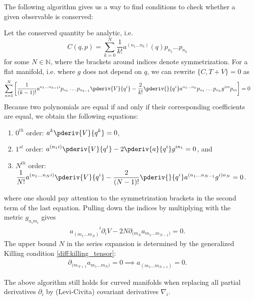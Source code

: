     The following algorithm gives us a way to find conditions to check whether a given observable is conserved:
    \begin{method}
        Let the conserved quantity be analytic, i.e. \[C(q, p) = \sum_{k=0}^N\frac{1}{k!}a^{(n_1\ldots n_k)}(q)p_{n_1}\ldots p_{n_k}\] for some $N\in\mathbb{N}$, where the brackets around indices denote symmetrization. For a flat manifold, i.e. where $g$ does not depend on $q$, we can rewrite $\{C, T+V\} = 0$ as \[\sum_{n = 1}^N\left[\frac{1}{(k-1)!}a^{n_1\ldots n_{k-1}i}p_{n_1}\ldots p_{n_{k-1}}\pderiv{V}{q^i} - \frac{2}{k!}\pderiv{}{q^i}a^{n_1\ldots n_k}p_{n_1}\ldots p_{n_k}g^{im}p_m\right] = 0\] Because two polynomials are equal if and only if their corresponding coefficients are equal, we obtain the following equations:
        \begin{enumerate}
            \item $0^{th}$ order: $\displaystyle a^k\pderiv{V}{q^k} = 0$,
            \item $1^{st}$ order: $\displaystyle a^{(n_1i)}\pderiv{V}{q^i} - 2\pderiv{a}{q^i}g^{in_1} = 0$, and
            \item $N^{th}$ order: $\displaystyle \frac{1}{N!}a^{(n_1\ldots n_Ni)}\pderiv{V}{q^i} - \frac{2}{(N-1)!}\pderiv{}{q^i}a^{(n_1\ldots n_{N-1}}g^{i)n_N} = 0$.
        \end{enumerate}
        where one should pay attention to the symmetrization brackets in the second term of the last equation. Pulling down the indices by multiplying with the metric $g_{n_im_i}$ gives
        \begin{gather}
            a_{(m_1\ldots m_N)}^{\phantom{(m_1\ldots m_N)}i}\partial_iV - 2N\partial_{(m_N}a_{m_1\ldots m_{N-1})} = 0.
        \end{gather}
        The upper bound $N$ in the series expansion is determined by the generalized Killing condition \ref{diff:killing_tensor}:
        \begin{gather}
            \partial_{(m_{N+1}}a_{m_1\ldots m_N)} = 0\implies a_{(m_1\ldots m_{N+1})} = 0.
        \end{gather}
    \end{method}
    \begin{remark}
        The above algorithm still holds for curved manifolds when replacing all partial derivatives $\partial_i$ by (Levi-Civita) covariant derivatives $\nabla_i$.
    \end{remark}

